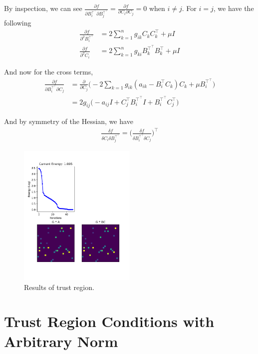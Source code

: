 \documentclass[a4paper]{article}
\begin{document}
By inspection, we can see $\frac{\partial f}{\partial B_i^{\intercal^\intercal} \partial B_j^{\intercal^\intercal}} =  \frac{\partial f}{\partial C_i \partial C_j} = 0$ when $i \neq j$. For $i = j$, we have the following
\begin{align*}
\frac{\partial f}{\partial^2 B_i^{\intercal^\intercal}} &= 2 \sum_{k=1}^n g_{ik} C_k C_k^\intercal + \mu I \\
\frac{\partial f}{\partial^2 C_i} &= 2 \sum_{k=1}^n g_{ki} B_k^{\intercal^\intercal} B_k^\intercal + \mu I
\end{align*}

And now for the cross terms,
\begin{align*}
\frac{\partial f}{\partial B_i^{\intercal^\intercal} \partial C_j}
&= \frac{\partial}{\partial C_j} \Big( -2 \sum_{k=1}g_{ik} (a_{ik} - B_i^\intercal C_k) C_k + \mu B_i^{\intercal^\intercal} \Big) \\
&=  2 g_{ij} \Big( -a_{ij} I + C_j^\intercal B_i^{\intercal^\intercal} I + B_i^{\intercal^\intercal} C_j^\intercal \Big)
\end{align*}

And by symmetry of the Hessian, we have
\begin{align*}
\frac{\delta f}{\delta C_i \delta B_j^{\intercal^\intercal}} = \Big( \frac{\delta f}{\delta B_i^{\intercal^\intercal} \delta C_j}\Big)^\intercal
\end{align*}

\begin{figure}[!h]
\centering
\includegraphics[width=0.5\textwidth]{low_rank_tr.png}
\caption{Results of trust region.}
\end{figure}

\section{Trust Region Conditions with Arbitrary Norm}
\end{document}
